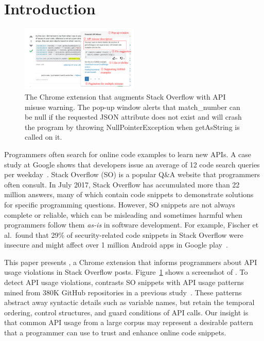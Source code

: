 \section{Introduction}
\label{sec:intro}

\begin{figure}
\centering
\includegraphics[width=0.5\textwidth]{soap-v4.pdf}
  \caption{The {\tool} Chrome extension that augments Stack Overflow with API misuse warning. The pop-up window alerts that {\ttt match\_number} can be {\ttt null} if the requested {\ttt JSON} attribute does not exist and will crash the program by throwing {\ttt NullPointerException} when {\ttt getAsString} is called on it.}
  \label{fig:screenshot}
  \vspace{-0.1in}
\end{figure}

Programmers often search for online code examples to learn new APIs. A case study at Google shows that developers issue an average of 12 code search queries per weekday~\cite{sadowski2015developers}. Stack Overflow (SO) is a popular Q\&A website that programmers often consult. In July 2017, Stack Overflow has accumulated more than 22 million answers, many of which contain code snippets to demonstrate solutions for specific programming questions. However, SO snippets are not always complete or reliable, which can be misleading and sometimes harmful when programmers follow them {\em as-is} in software development. For example, Fischer et al.~found that 29\% of security-related code snippets in Stack Overflow were insecure and might affect over 1 million Android apps in Google play~\cite{fischer2017stack}. 

This paper presents {\tool}, a Chrome extension that informs programmers about API usage violations in Stack Overflow posts. Figure~\ref{fig:screenshot} shows a screenshot of {\tool}. To detect API usage violations, {\tool} contrasts SO snippets with API usage patterns mined from 380K GitHub repositories in a previous study~\cite{zhang2018code}. These patterns abstract away syntactic details such as variable names, but retain the temporal ordering, control structures, and guard conditions of API calls. Our insight is that common API usage from a large corpus may represent a desirable pattern that a programmer can use to trust and enhance online code snippets. 

